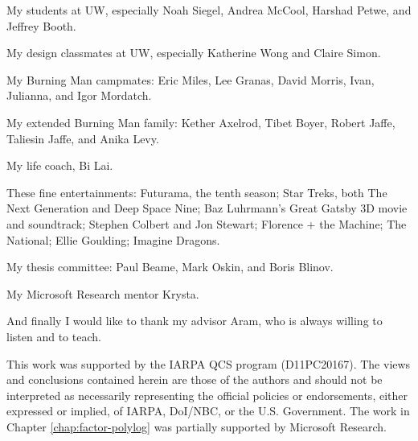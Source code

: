 My students at UW, especially Noah Siegel, Andrea McCool, Harshad Petwe, and Jeffrey Booth.

My design classmates at UW, especially Katherine Wong and Claire Simon.

My Burning Man campmates: Eric Miles, Lee Granas, David Morris, Ivan, Julianna, and Igor Mordatch.

My extended Burning Man family: Kether Axelrod, Tibet Boyer, Robert Jaffe, Taliesin Jaffe, and Anika Levy.

My life coach, Bi Lai.

These fine entertainments: Futurama, the tenth season; Star Treks, both The Next Generation and Deep Space Nine; Baz Luhrmann's Great Gatsby 3D movie and soundtrack; Stephen Colbert and Jon Stewart;
Florence + the Machine; The National; Ellie Goulding; Imagine Dragons.

My thesis committee: Paul Beame, Mark Oskin, and Boris Blinov.

My Microsoft Research mentor Krysta.

And finally I would like to thank my advisor Aram,
who is always willing to listen and to teach.

This work was supported by
the IARPA QCS program (D11PC20167).  The
views and conclusions contained herein are those of the authors and
should not be interpreted as necessarily representing the official
policies or endorsements, either expressed or implied, of IARPA,
DoI/NBC, or the U.S. Government.
The work in Chapter \ref{chap:factor-polylog}
was partially supported by Microsoft Research.
